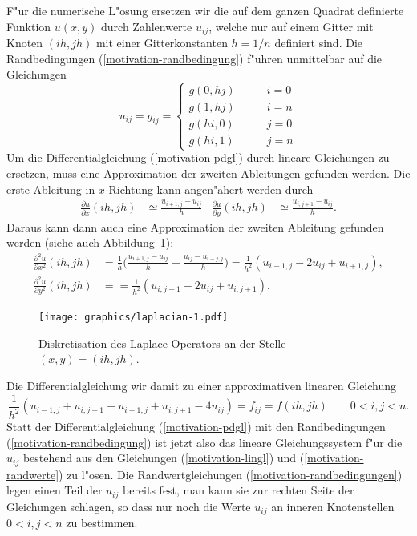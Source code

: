 F"ur die numerische L"osung ersetzen wir die auf dem ganzen Quadrat
definierte Funktion $u(x,y)$ durch Zahlenwerte $u_{ij}$, welche nur
auf einem Gitter mit Knoten $(ih, jh)$ mit einer Gitterkonstanten $h = 1/n$
definiert sind.
Die Randbedingungen (\ref{motivation-randbedingung}) f"uhren unmittelbar
auf die Gleichungen
\begin{equation}
u_{ij}=g_{ij}=\begin{cases}
g(0,hj)&\qquad i = 0\\
g(1,hj)&\qquad i = n\\
g(hi,0)&\qquad j = 0\\
g(hi,1)&\qquad j = n
\end{cases}
\label{motivation-randwerte}
\end{equation}
Um die Differentialgleichung (\ref{motivation-pdgl}) durch lineare Gleichungen
zu ersetzen, muss eine Approximation der zweiten Ableitungen
gefunden werden.
Die erste Ableitung in $x$-Richtung kann angen"ahert werden durch
\begin{align*}
\frac{\partial u}{\partial x}(ih,jh)&\simeq \frac{u_{i+1,j}-u_{ij}}h
&
\frac{\partial u}{\partial y}(ih,jh)&\simeq \frac{u_{i,j+1}-u_{ij}}h.
\end{align*}
Daraus kann dann auch eine Approximation der zweiten Ableitung
gefunden werden (siehe auch Abbildung~\ref{algorithm:laplacian}):
\begin{align*}
\frac{\partial^2 u}{\partial x^2}(ih,jh)&=\frac1h\biggl(
\frac{u_{i+1,j}-u_{ij}}h-\frac{u_{ij}-u_{i-j,j}}h
\biggr)
=\frac1{h^2}(u_{i-1,j}-2u_{ij}+u_{i+1,j}),\\
\frac{\partial^2 u}{\partial y^2}(ih,jh)&=
=\frac1{h^2}(u_{i,j-1}-2u_{ij}+u_{i,j+1}).
\end{align*}
\begin{figure}
\begin{center}
\texttt{[image: graphics/laplacian-1.pdf]}
\end{center}
\caption{Diskretisation des Laplace-Operators an der Stelle $(x,y)=(ih, jh)$.
\label{algorithm:laplacian}}
\end{figure}
Die Differentialgleichung wir damit zu einer approximativen linearen
Gleichung 
\begin{equation}
\frac1{h^2}(u_{i-1,j}+u_{i,j-1}+u_{i+1,j}+u_{i,j+1}-4u_{ij})=f_{ij}=f(ih,jh)
\qquad 0<i,j<n.
\label{motivation-lingl}
\end{equation}
Statt der Differentialgleichung (\ref{motivation-pdgl}) mit den Randbedingungen
(\ref{motivation-randbedingung}) ist jetzt also das lineare Gleichungssystem
f"ur die $u_{ij}$ bestehend aus den Gleichungen (\ref{motivation-lingl}) und
(\ref{motivation-randwerte}) zu l"osen.
Die Randwertgleichungen (\ref{motivation-randbedingungen})
legen einen Teil der $u_{ij}$ bereits fest,
man kann sie zur rechten Seite der Gleichungen schlagen,
so dass nur noch die Werte $u_{ij}$ an inneren Knotenstellen $0<i,j<n$
zu bestimmen.

